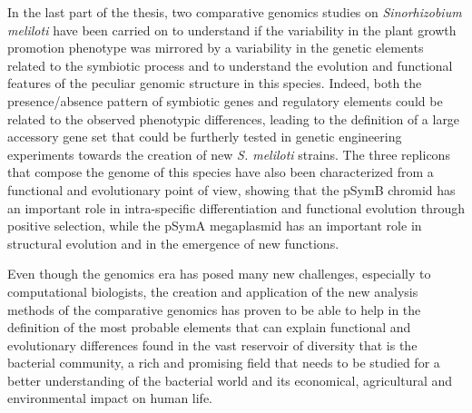 In the last part of the thesis, two comparative genomics studies on \textit{Sinorhizobium meliloti} have been carried on to understand if the variability in the plant growth promotion phenotype was mirrored by a variability in the genetic elements related to the symbiotic process and to understand the evolution and functional features of the peculiar genomic structure in this species. Indeed, both the presence/absence pattern of symbiotic genes and regulatory elements could be related to the observed phenotypic differences, leading to the definition of a large accessory gene set that could be furtherly tested in genetic engineering experiments towards the creation of new \textit{S. meliloti} strains. The three replicons that compose the genome of this species have also been characterized from a functional and evolutionary point of view, showing that the pSymB chromid has an important role in intra-specific differentiation and functional evolution through positive selection, while the pSymA megaplasmid has an important role in structural evolution and in the emergence of new functions.

Even though the genomics era has posed many new challenges, especially to computational biologists, the creation and application of the new analysis methods of the comparative genomics has proven to be able to help in the definition of the most probable elements that can explain functional and evolutionary differences found in the vast reservoir of diversity that is the bacterial community, a rich and promising field that needs to be studied for a better understanding of the bacterial world and its economical, agricultural and environmental impact on human life.